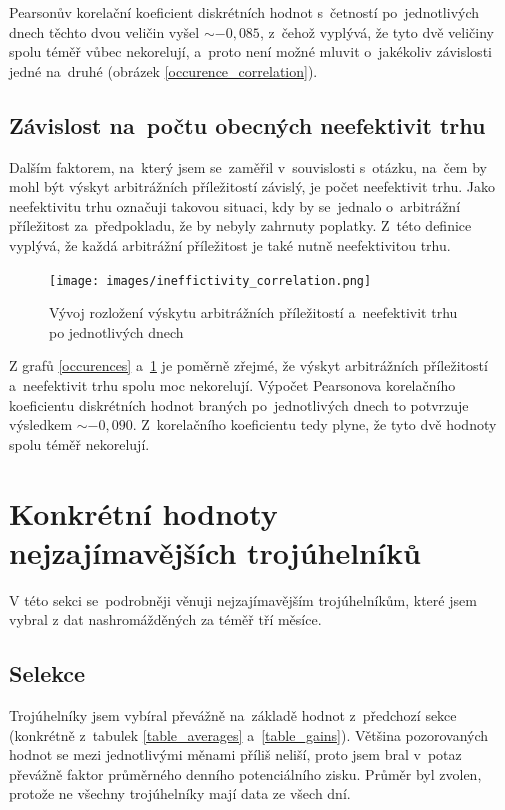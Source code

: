 \documentclass[thesis=B,czech]{FITthesis}[2019/03/21]
\begin{document}
Pearsonův korelační koeficient diskrétních hodnot s~četností po~jednotlivých dnech těchto dvou veličin vyšel \(\sim-0,085\), z~čehož vyplývá, že tyto dvě veličiny spolu téměř vůbec nekorelují, a~proto není možné mluvit o~jakékoliv závislosti jedné na~druhé (obrázek \ref{occurence_correlation}).

\subsection{Závislost na~počtu obecných neefektivit trhu}
Dalším faktorem, na~který jsem se~zaměřil v~souvislosti s~otázku, na~čem by mohl být výskyt arbitrážních příležitostí závislý, je počet neefektivit trhu. Jako neefektivitu trhu označuji takovou situaci, kdy by se~jednalo o~arbitrážní příležitost za~předpokladu, že by nebyly zahrnuty poplatky. Z~této definice vyplývá, že každá arbitrážní příležitost je také nutně neefektivitou trhu.

\begin{figure}[H]\centering
	\texttt{[image: images/ineffictivity\_correlation.png]}
	\caption{Vývoj rozložení výskytu arbitrážních příležitostí a~neefektivit trhu po jednotlivých dnech}
	\label{ineffictivity_correlation}
\end{figure}
\newpage
Z grafů \ref{occurences} a~\ref{ineffictivity_correlation} je poměrně zřejmé, že výskyt arbitrážních příležitostí \linebreak a~neefektivit trhu spolu moc nekorelují. Výpočet Pearsonova korelačního \linebreak koeficientu diskrétních hodnot braných po~jednotlivých dnech to potvrzuje výsledkem \(\sim-0,090\). Z~korelačního koeficientu tedy plyne, že tyto dvě hodnoty spolu téměř nekorelují.

\section{Konkrétní hodnoty nejzajímavějších trojúhelníků}
V této sekci se~podrobněji věnuji nejzajímavějším trojúhelníkům, které jsem vybral z dat nashromážděných za téměř tří měsíce. 

\subsection{Selekce}
Trojúhelníky jsem vybíral převážně na~základě hodnot z~předchozí sekce \linebreak (konkrétně z~tabulek \ref{table_averages} a~\ref{table_gains}). Většina pozorovaných hodnot se mezi jednotlivými měnami příliš neliší, proto jsem bral v~potaz převážně faktor průměrného denního potenciálního zisku. Průměr byl zvolen, protože ne všechny trojúhelníky mají data ze všech dní.
\end{document}
